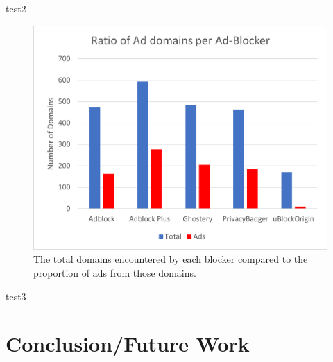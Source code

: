\documentclass[sigsmall]{acmart}
\begin{document}
test2

\begin{figure}
  \includegraphics[scale =1.5]{Ratio-of-Ad-domains-per-ad-blocker.png}
  \caption{The total domains encountered by each blocker compared to the proportion of ads from those domains.}
  \label{fig:graph2}
\end{figure}

test3


\section*{Conclusion/Future Work}




\end{document}
